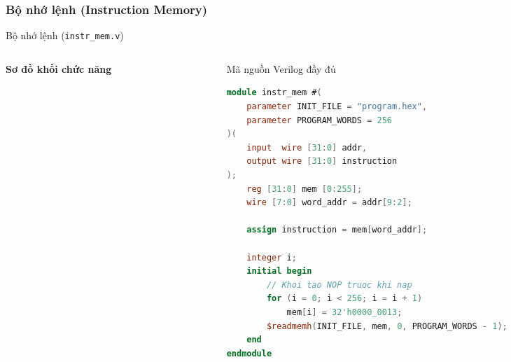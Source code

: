 \subsubsection{Bộ nhớ lệnh (Instruction Memory)}
\begin{frame}[fragile]{Bộ nhớ lệnh (\texttt{instr\_mem.v})}
    \begin{columns}
        \begin{column}{0.48\textwidth}
            \centering
            \textbf{Sơ đồ khối chức năng}
            \vspace{0.3cm}
            
        \end{column}
        
        \begin{column}{0.48\textwidth}
            \begin{block}{Mã nguồn Verilog đầy đủ}
                \begin{lstlisting}[language=Verilog, basicstyle=\tiny\ttfamily, keywordstyle=\color{blue}, commentstyle=\color{gray}]
module instr_mem #(
    parameter INIT_FILE = "program.hex",
    parameter PROGRAM_WORDS = 256
)(
    input  wire [31:0] addr,
    output wire [31:0] instruction
);
    reg [31:0] mem [0:255];
    wire [7:0] word_addr = addr[9:2];

    assign instruction = mem[word_addr];

    integer i;
    initial begin
        // Khoi tao NOP truoc khi nap
        for (i = 0; i < 256; i = i + 1)
            mem[i] = 32'h0000_0013;
        $readmemh(INIT_FILE, mem, 0, PROGRAM_WORDS - 1);
    end
endmodule
                \end{lstlisting}
            \end{block}
        \end{column}
    \end{columns}
\end{frame}
